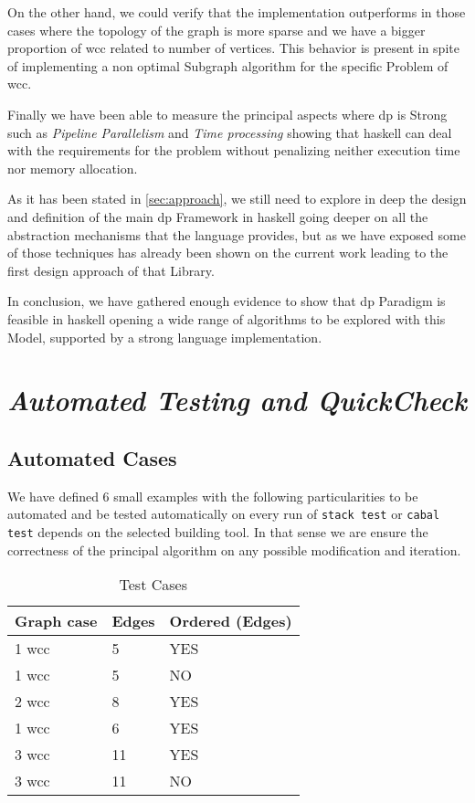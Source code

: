 \documentclass[preprint]{elsarticle}
\begin{document}
On the other hand, we could verify that the implementation outperforms in those cases where the topology of the graph is more sparse and we have a bigger proportion of \acrshort{wcc} related to number of vertices. This behavior is present in spite of implementing a non optimal Subgraph algorithm for the specific Problem of \acrshort{wcc}.

Finally we have been able to measure the principal aspects where \acrshort{dp} is Strong such as \textit{Pipeline Parallelism} and \textit{Time processing} showing that \acrshort{haskell} can deal with the requirements for the problem without penalizing neither execution time nor memory allocation.

As it has been stated in \autoref{sec:approach}, we still need to explore in deep the design and definition of the main \acrshort{dp} Framework in \acrshort{haskell} going deeper on all the abstraction mechanisms that the language provides, but as we have exposed some of those techniques has already been shown on the current work leading to the first design approach of that Library.

In conclusion, we have gathered enough evidence to show that \acrfull{dp} Paradigm is feasible in \acrshort{haskell} opening a wide range of algorithms to be explored with this Model, supported by a strong language implementation.



\printglossary

\appendix
\section{\textit{Automated Testing and QuickCheck}}
\subsection{Automated Cases}
We have defined 6 small examples with the following particularities to be automated and be tested automatically on every run of \texttt{stack test} or \texttt{cabal test} depends on the selected building tool. In that sense
we are ensure the correctness of the principal algorithm on any possible modification and iteration. 

\begin{table}[H]
  \centering
  \begin{tabular}{|l|l|l|}
   \hline
   Graph case & Edges & Ordered (Edges)\\
   \hline
   1 \acrshort{wcc} & 5 & YES \\
   \hline
   1 \acrshort{wcc} & 5 & NO \\
   \hline
   2 \acrshort{wcc} & 8 & YES \\
   \hline
   1 \acrshort{wcc} & 6 & YES \\
   \hline
   3 \acrshort{wcc} & 11 & YES \\
   \hline
   3 \acrshort{wcc} & 11 & NO \\
   \hline
  \end{tabular}
 \caption{Test Cases}
 \label{table:apx:1}
 \end{table}
\end{document}
